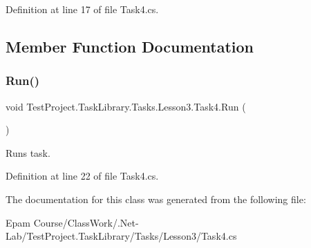 Definition at line 17 of file Task4.\+cs.



\subsection{Member Function Documentation}
\mbox{\label{class_test_project_1_1_task_library_1_1_tasks_1_1_lesson3_1_1_task4_a7b8ee0f442413f8579a30483c4b1d6d9}} 
\subsubsection{\texorpdfstring{Run()}{Run()}}
{\footnotesize\ttfamily void Test\+Project.\+Task\+Library.\+Tasks.\+Lesson3.\+Task4.\+Run (\begin{DoxyParamCaption}{ }\end{DoxyParamCaption})}



Runs task. 



Definition at line 22 of file Task4.\+cs.



The documentation for this class was generated from the following file\+:\begin{DoxyCompactItemize}
\item 
Epam Course/\+Class\+Work/.\+Net-\/\+Lab/\+Test\+Project.\+Task\+Library/\+Tasks/\+Lesson3/Task4.\+cs\end{DoxyCompactItemize}
